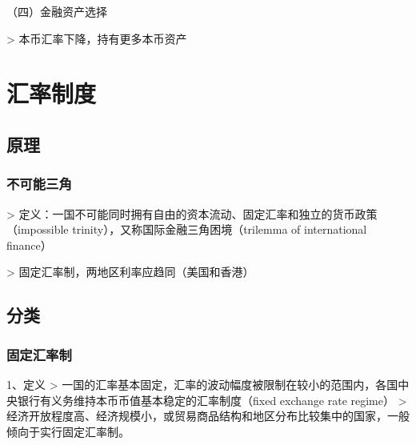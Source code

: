 \documentclass[12pt]{book}
\begin{document}
（四）金融资产选择	

> 本币汇率下降，持有更多本币资产






















\section{汇率制度}







\subsection{原理}

\subsubsection{不可能三角}

> 定义：一国不可能同时拥有自由的资本流动、固定汇率和独立的货币政策（impossible trinity），又称国际金融三角困境（trilemma of international finance）


> 固定汇率制，两地区利率应趋同（美国和香港）


\subsection{分类}

\subsubsection{固定汇率制}

1、定义
> 一国的汇率基本固定，汇率的波动幅度被限制在较小的范围内，各国中央银行有义务维持本币币值基本稳定的汇率制度（fixed exchange rate regime）  
> 经济开放程度⾼、经济规模⼩，或贸易商品结构和地区分布⽐较集中的国家，⼀般倾向于实⾏固定汇率制。
\end{document}
